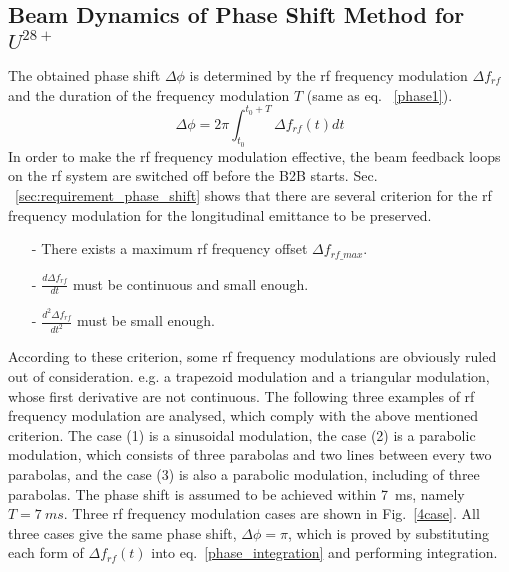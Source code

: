 \subsection{Beam Dynamics of Phase Shift Method for $U^\mathit{28+}$}
The obtained phase shift $\Delta \phi$ is determined by the rf frequency modulation $\Delta f_{rf}$ and the duration of the frequency modulation $T$ (same as eq. ~\ref{phase1}). 
\begin{equation}
\Delta \phi= 2\pi \int_{t_0}^{t_0+T} \Delta f_{rf}(t)dt \label{phase_integration}
\end{equation}
In order to make the rf frequency modulation effective, the beam feedback loops on the rf system are switched off before the B2B starts. Sec. ~\ref{sec:requirement_phase_shift} shows that there are several criterion for the rf frequency modulation for the longitudinal emittance to be preserved.
\begin{itemize}
\item[-]
There exists a maximum rf frequency offset $\Delta f_\mathit{rf\_max}$. 
\item[-]
$\frac{d\Delta f_{\mathit{rf}}}{dt}$ must be continuous and small enough. 
\item[-]
$\frac{d^2\Delta f_{\mathit{rf}}}{dt^2}$ must be small enough. 
\end{itemize}

According to these criterion, some rf frequency modulations are obviously ruled out of consideration. e.g. a trapezoid modulation and a triangular modulation, whose first derivative are not continuous. The following three examples of rf frequency modulation are analysed, which comply with the above mentioned criterion. The case (1) is a sinusoidal modulation, the case (2) is a parabolic modulation, which consists of three parabolas and two lines between every two parabolas, and the case (3) is also a parabolic modulation, including of three parabolas. The phase shift is assumed to be achieved within \SI{7}{ms}, namely $T=\SI{7}{ms}$. Three rf frequency modulation cases are shown in Fig.~\ref{4case}. All three cases give the same phase shift, $\Delta \phi=\pi$, which is proved by substituting each form of $\Delta f_{rf}(t)$ into eq.~\ref{phase_integration} and performing integration. 

